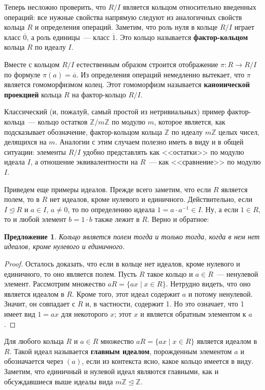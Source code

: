 \documentclass[a4paper,11pt]{scrartcl}
\theoremstyle{plain}
\newtheorem{proposition}[theorem]{Предложение}
\theoremstyle{definition}
\newcommand\dfn[1]{\textbf{#1}}
\newcommand\mb{\mathbb}
\newcommand\trleq{\trianglelefteq}
\begin{document}
Теперь несложно проверить, что $R/I$ является кольцом относительно
введенных операций: все нужные свойства напрямую следуют из
аналогичных свойств кольца $R$ и определения операций. Заметим, что
роль нуля в кольце $R/I$ играет класс $\overline{0}$, а роль
единицы~--- класс $\overline{1}$. Это кольцо называется
\dfn{фактор-кольцом} кольца $R$ по идеалу $I$.

Вместе с кольцом $R/I$ естественным образом строится отображение
$\pi\colon R\to R/I$ по формуле $\pi(a)=\overline{a}$. Из определения
операций немедленно вытекает, что $\pi$ является гомоморфизмом колец.
Этот гомоморфизм называется \dfn{канонической проекцией} кольца $R$ на
фактор-кольцо $R/I$.

Классический (и, пожалуй, самый простой из нетривиальных) пример
фактор-кольца~--- кольцо остатков $\mb Z/m\mb Z$ по модулю $m$,
которое является, как подсказывает обозначение, фактор-кольцом кольца
$\mb Z$ по идеалу $m\mb Z$ целых чисел, делящихся на $m$. Аналогии с
этим случаем полезно иметь в виду и в общей ситуации: элементы $R/I$
удобно представлять как <<остатки>> по модулю идеала $I$, а отношение
эквивалентности на $R$~--- как <<сравнение>> по модулю $I$.



Приведем еще примеры идеалов.
Прежде всего заметим, что если $R$ является полем, то в $R$ нет
идеалов, кроме нулевого и единичного. Действительно, если $I\trleq R$
и $a\in I$, $a\neq 0$, то по определению идеала $1=a\cdot a^{-1}\in
I$. Ну, а если $1\in R$, то и любой элемент $b=1\cdot b$ также лежит в
$R$. Верно и обратное:

\begin{proposition}
Кольцо является полем тогда и только тогда, когда в нем нет
идеалов, кроме нулевого и единичного.
\end{proposition}
\begin{proof}
Осталось доказать, что если в кольце нет идеалов, кроме нулевого и
единичного, то оно является полем. Пусть $R$ такое кольцо и $a\in
R$~--- ненулевой элемент. Рассмотрим множество $aR=\{ax\mid x\in
R\}$. Нетрудно видеть, что оно является идеалом в $R$. Кроме того,
этот идеал содержит $a$ и потому ненулевой. Значит, он совпадает с $R$
и, в частности, содержит 1. Но это означает, что 1 имеет вид $1=ax$
для некоторого $x$; этот $x$ и является обратным элементом к $a$.
\end{proof}

Для любого кольца $R$ и $a\in R$ множество $aR=\{ax\mid x\in R\}$
является идеалом в $R$. Такой идеал называется
\dfn{главным идеалом}, порожденным элементом $a$ и обозначается через
$(a)$, если из контекста ясно, какое кольцо имеется в виду. Заметим,
что единичный и нулевой идеал являются главными, как и обсуждавшиеся
выше идеалы вида $m\mb Z\trleq\mb Z$.
\end{document}
